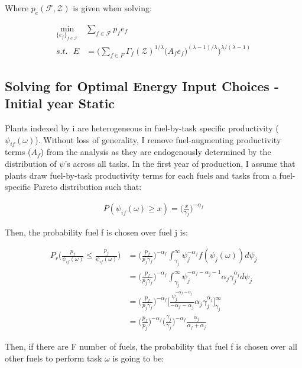 \documentclass{article}
\begin{document}
Where $p_e(\mathcal{F},\mathcal{Z})$ is given when solving:

\begin{align*}
    \min_{\{e_f\}_{f \in \mathcal{F}}} &\sum_{f \in \mathcal{F}} p_f e_f \\
    s.t. \text{   } E &= \Bigg( \sum_{f \in F} \Gamma_f(\mathcal{Z})^{1/\lambda} \big( A_f e_f \big)^{(\lambda-1)/\lambda} \Bigg)^{\lambda/(\lambda-1)} 
\end{align*}

\subsection{Solving for Optimal Energy Input Choices - Initial year Static}

Plants indexed by i are heterogeneous in fuel-by-task specific productivity ($\psi_{if}(\omega)$). Without loss of generality, I remove fuel-augmenting productivity terms ($A_f$) from the analysis as they are endogenously determined by the distribution of $\psi$'s across all tasks. In the first year of production, I assume that plants draw fuel-by-task productivity terms for each fuels and tasks from a fuel-specific Pareto distribution such that:

\begin{align*}
    P(\psi_{if}(\omega) \geq x) = \Big(\frac{x}{\gamma_f}\Big)^{-\alpha_f}
\end{align*}

Then, the probability fuel f is chosen over fuel j is:

\begin{align*}
    P_r\Big(\frac{p_f}{\psi_{if}(\omega)} \leq \frac{p_j}{\psi_{if}(\omega)}\Big) &= \Big( \frac{p_f}{p_j \gamma_f}\Big)^{-\alpha_f} \int_{\gamma_j}^{\infty} \psi_j^{-\alpha_f}f(\psi_j(\omega)) d\psi_j \\
    &= \Big( \frac{p_f}{p_j \gamma_f}\Big)^{-\alpha_f} \int_{\gamma_j}^{\infty} \psi_j^{-\alpha_f-\alpha_j-1} \alpha_j \gamma_j^{\alpha_j} d\psi_j \\
    &= \Big( \frac{p_f}{p_j \gamma_f}\Big)^{-\alpha_f} \Big[ \frac{\psi_j^{-\alpha_f-\alpha_j}}{-\alpha_f-\alpha_j} \alpha_j \gamma_j^{\alpha_j} \Big]_{\gamma_j}^{\infty} \\
    &= \Big( \frac{p_f}{p_j} \Big)^{-\alpha_f} \Big( \frac{\gamma_j}{\gamma_f} \Big)^{-\alpha_f} \frac{\alpha_j}{\alpha_f+\alpha_j}
\end{align*}

Then, if there are F number of fuels, the probability that fuel f is chosen over all other fuels to perform task $\omega$ is going to be:
\end{document}
